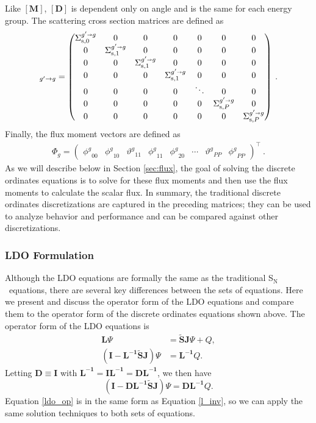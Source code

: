 \documentclass{article} %
\newcommand{\sa}{\shortrightarrow}
\newcommand{\sn}{S$_\mathrm{N}$}
\newcommand{\ve}[1]{\ensuremath{\mathbf{#1}}}
\newcommand{\Sigg}[1]{\ensuremath{\Sigma^{g'\sa g}_{\text{s},#1}}}
\newcommand{\even}{\ensuremath{\phi^g}}
\newcommand{\odd}{\ensuremath{\vartheta^g}}
\begin{document}
%
Like $[\ve{M}]$, $[\ve{D}]$ is dependent only on angle and is the
same for each energy group. The scattering cross section matrices are defined
as
%
\begin{equation}
  [\ve{S}]_{g'\rightarrow g} = \begin{pmatrix}
    \Sigg{0} & 0 & 0 & 0 & 0 & 0 & 0 \\
    0 & \Sigg{1} & 0 & 0 & 0 & 0 & 0 \\
    0 & 0 & \Sigg{1} & 0 & 0 & 0 & 0 \\
    0 & 0 & 0 & \Sigg{1} & 0 & 0 & 0 \\
    0 & 0 & 0 & 0 & \ddots   & 0 & 0 \\
    0 & 0 & 0 & 0 & 0 & \Sigg{P} & 0 \\
    0 & 0 & 0 & 0 & 0 & 0 & \Sigg{P}
  \end{pmatrix}\:.
\label{denovo_scatter}
\end{equation}
%
Finally, the flux moment vectors are defined as
%
\begin{align}
  \Phi_g = \begin{pmatrix}
    \even_{00} & \even_{10} & \odd_{11} & \even_{11} & \even_{20}
    & \cdots & \odd_{PP} & \even_{PP}
  \end{pmatrix}^\top\:.
\end{align}
%
As we will describe below in Section \ref{sec:flux}, the 
goal of solving the discrete ordinates equations is to solve for these flux
moments and then use the flux moments to calculate the scalar flux. In summary,
the traditional discrete ordinates discretizations are captured in the
preceding matrices; they can be used to analyze behavior and performance and
can be compared against other discretizations.

\subsubsection{LDO Formulation}

Although the LDO equations are formally the same as the traditional \sn\
equations, there are several key differences between the sets of equations.
Here we present and discuss the operator form of the LDO equations and
compare them to the operator form of the discrete ordinates
equations shown above. The operator form of the LDO equations is
%
\begin{align}
\ve{L}\Psi &= \ve{\tilde{S}J}\Psi + Q, \\
\left(\ve{I} - \ve{L^{-1} \tilde{S}J}\right)\Psi &= \ve{L^{-1}}Q.
\end{align}
%
Letting $\ve{D} \equiv \ve{I}$ with 
$\ve{L^{-1}} = \ve{I}\ve{L^{-1}} = \ve{D}\ve{L^{-1}}$, we then have
%
\begin{equation}
\left(\ve{I} - \ve{D L^{-1} \tilde{S}J}\right)\Psi = \ve{D L^{-1}}Q.
\label{ldo_op}
\end{equation}
%
Equation \eqref{ldo_op} is in the same form as Equation \eqref{l_inv},
so we can apply the same solution techniques to both sets of equations.
\end{document}
